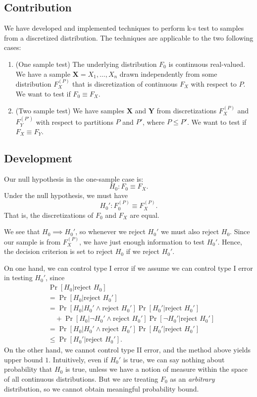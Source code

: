 \subsection*{Contribution}
We have developed and implemented techniques to perform k-s test to samples from a discretized distribution. The techniques are applicable to the two following cases:
\begin{enumerate}
	\item (One sample test) The underlying distribution $F_0$ is continuous real-valued. We have a sample $\mathbf{X} = X_1, \ldots, X_n$ drawn independently from some distribution $F_X^{(P)}$ that is discretization of continuous  $F_X$ with respect to $P$. We want to test if $F_0 \equiv F_X$. 
	\item (Two sample test)
		We have samples $\mathbf{X}$ and $\mathbf{Y}$ from discretizations $F_X^{(P)}$ and $F_Y^{(P')}$ with respect to partitions $P$ and $P'$, where $P \le  P'$. We want to test if $F_X \equiv F_Y$.
\end{enumerate}

\subsection*{Development}
Our null hypothesis in the one-sample case is:
 \[
	H_0: F_0 \equiv F_X
.\] 
Under the null hypothesis, we must have
\[
	H_0': F_0^{(P)}\equiv F_X^{(P)}
.\] 
That is, the discretizations of $F_0$ and $F_X$ are equal.

We see that $H_0 \implies H_0'$, so whenever we reject $H_0'$ we must also reject $H_0$. Since our sample is from $F_X^{(P)}$, we have just enough information to test $H_0'$. Hence, the decision criterion is set to reject $H_0$ if we reject $H_0'$.

	On one hand, we can control type I error if we assume we can control type I error in testing $H_0'$, since
	\begin{align*}
		&\operatorname{Pr} \left[ H_0 | \text{reject }H_0 \right] \\
		&=\operatorname{Pr} \left[ H_0 | \text{reject }H_0' \right] \\
		&=\operatorname{Pr} \left[ H_0 | H_0' \land \text{reject }H_0' \right] \operatorname{Pr} \left[ H_0' | \text{reject }H_0' \right]\\
		&\quad +\operatorname{Pr} \left[ H_0 | \lnot H_0' \land \text{reject }H_0' \right] \operatorname{Pr} \left[ \lnot H_0' | \text{reject }H_0' \right]  \\
		&=\operatorname{Pr} \left[ H_0 | H_0' \land \text{reject }H_0' \right] \operatorname{Pr} \left[ H_0' | \text{reject }H_0' \right]\\
		&\le \operatorname{Pr} \left[ H_0' | \text{reject }H_0' \right]
	.\end{align*} 
	 On the other hand, we cannot control type II error, and the method above yields upper bound $1$. Intuitively, even if $H_0'$ is true, we can say nothing about probability that $H_0$ is true, unless we have a notion of measure within the space of all continuous distributions. But we are treating $F_0$ as an \textit{arbitrary} distribution, so we cannot obtain meaningful probability bound.

